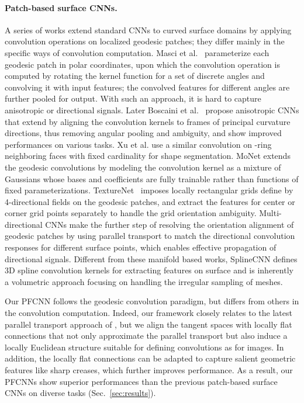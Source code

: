 \documentclass[10pt,twocolumn,letterpaper]{article}
\begin{document}
\paragraph{Patch-based surface CNNs.}
A series of works extend standard CNNs to curved surface domains by applying convolution operations on localized geodesic patches; they differ mainly in the specific ways of convolution computation.
Masci et al.~\cite{GeoCNN:ICCV2015} parameterize each geodesic patch in polar coordinates, upon which the convolution operation is computed by rotating the kernel function for a set of discrete angles and convolving it with input features; the convolved features for different angles are further pooled for output.
With such an approach, it is hard to capture anisotropic or directional signals.
Later Boscaini et al.~\cite{AnisoCNN:NIPS2016} propose anisotropic CNNs that extend \cite{GeoCNN:ICCV2015} by aligning the convolution kernels to frames of principal curvature directions, thus removing angular pooling and ambiguity, and  show improved performances on various tasks.
Xu et al. \cite{Zhong:DirectionalCNN:2017} use a similar convolution on -ring neighboring faces with fixed cardinality for shape segmentation.
MoNet \cite{MoNet2017} extends the geodesic convolutions by modeling the convolution kernel as a mixture of Gaussians whose bases and coefficients are fully trainable rather than functions of fixed parameterizations.
TextureNet~\cite{Huang_2019_CVPR} imposes locally rectangular grids define by 4-directional fields on the geodesic patches, and extract the features for center or corner grid points separately to handle the grid orientation ambiguity.
Multi-directional CNNs \cite{Poulenard:2018:Multidirectional} make the further step of resolving the orientation alignment of geodesic patches by using parallel transport to match the directional convolution responses for different surface points, which enables effective propagation of directional signals.
Different from these manifold based works, SplineCNN \cite{SplineCNN} defines 3D spline convolution kernels for extracting features on surface and is inherently a volumetric approach focusing on handling the irregular sampling of meshes.

Our PFCNN follows the geodesic convolution paradigm, but differs from others in the convolution computation.
Indeed, our framework closely relates to the latest parallel transport approach of \cite{Poulenard:2018:Multidirectional}, but we align the tangent spaces with locally flat connections that not only approximate the parallel transport but also induce a locally Euclidean structure suitable for defining convolutions as for images.
In addition, the locally flat connections can be adapted to capture salient geometric features like sharp creases, which further improves performance.
As a result, our PFCNNs show superior performances than the previous patch-based surface CNNs on diverse tasks (Sec.~\ref{sec:results}).
\end{document}
